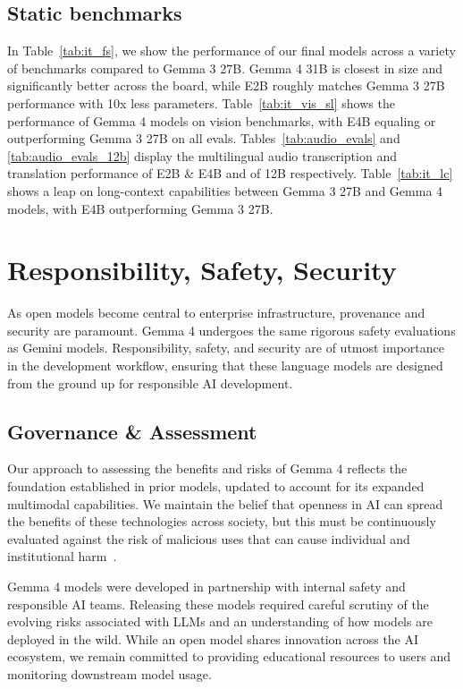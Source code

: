 \documentclass[11pt, a4paper, logo, twocolumn, copyright]{googledeepmind}
\begin{document}
\subsection{Static benchmarks}

In Table~\ref{tab:it_fs}, we show the performance of our final models across a variety of benchmarks compared to Gemma 3 27B. Gemma 4 31B is closest in size and significantly better across the board, while E2B roughly matches Gemma 3 27B performance with 10x less parameters.
Table~\ref{tab:it_vis_sl} shows the performance of Gemma 4 models on vision benchmarks, with E4B equaling or outperforming Gemma 3 27B on all evals.
Tables~\ref{tab:audio_evals} and \ref{tab:audio_evals_12b} display the multilingual audio transcription and translation performance of E2B \& E4B and of 12B respectively.
Table~\ref{tab:it_lc} shows a leap on long-context capabilities between Gemma 3 27B and Gemma 4 models, with E4B outperforming Gemma 3 27B. 


\section{Responsibility, Safety, Security}
\label{safety}

As open models become central to enterprise infrastructure, provenance and security are paramount. Gemma 4 undergoes the same rigorous safety evaluations as Gemini models. Responsibility, safety, and security are of utmost importance in the development workflow, ensuring that these language models are designed from the ground up for responsible AI development.

\subsection{Governance \& Assessment}

Our approach to assessing the benefits and risks of Gemma 4 reflects the foundation established in prior models, updated to account for its expanded multimodal capabilities. We maintain the belief that openness in AI can spread the benefits of these technologies across society, but this must be continuously evaluated against the risk of malicious uses that can cause individual and institutional harm~\citep{weidinger2021ethicalsocialrisksharm}. 

Gemma 4 models were developed in partnership with internal safety and responsible AI teams. Releasing these models required careful scrutiny of the evolving risks associated with LLMs and an understanding of how models are deployed in the wild. While an open model shares innovation across the AI ecosystem, we remain committed to providing educational resources to users and monitoring downstream model usage.
\end{document}

